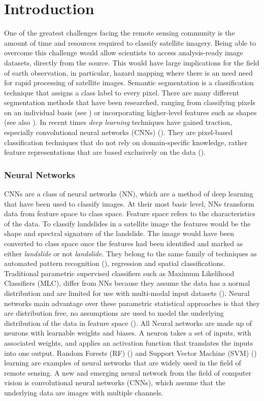 \chapter{Introduction}
One of the greatest challenges facing the remote sensing community is the amount of time and resources required to classify satellite imagery. Being able to overcome this challenge would allow scientists to access analysis-ready image datasets, directly from the source. This would have large implications for the field of earth observation, in particular, hazard mapping where there is an need need for rapid processing of satellite images. Semantic segmentation is a classification technique that assigns a class label to every pixel. There are many different segmentation methods that have been researched, ranging from classifying pixels on an individual basis (see \cite{de01,dwivedi04,enderle05,hussain13, weih10}) or incorporating higher-level features such as shapes (see also \cite{akccay08,holt09,martha11}). In recent times \textit{deep learning} techniques have gained traction, especially convolutional neural networks (CNNs) (\cite{maggiori17a, maggiori17b, mnih13, volpi17}). They are pixel-based classification techniques that do not rely on domain-specific knowledge, rather feature representations that are based exclusively on the data (\cite{maggiori17a,xiao17}).
\subsection*{Neural Networks}
CNNs are a class of neural networks (NN), which are a method of deep learning that have been used to classify images. At their most basic level, NNs transform data from feature space to class space. Feature space refers to the characteristics of the data. To classify landslides in a satellite image the features would be the shape and spectral signature of the landslide. The image would have been converted to class space once the features had been identified and marked as either \textit{landslide} or not \textit{landslide}. They belong to the same family of techniques as automated pattern recognition (\cite{Ritter89}), regression and spatial classifications. Traditional parametric supervised classifiers such as Maximum Likelihood Classifiers (MLC), differ from NNs because they assume the data has a normal distribution and are limited for use with multi-modal input datasets (\cite{Liu11}). Neural networks main advantage over these parametric statistical approaches is that they are distribution free, no assumptions are used to model the underlying distribution of the data in feature space (\cite{Patricia97}). All Neural networks are made up of neurons with learnable weights and biases. A neuron takes a set of inputs, with associated weights, and applies an activation function that translates the inputs into one output. Random Forests (RF) (\cite{belgiu16,Breiman01}) and Support Vector Machine (SVM) (\cite{cortes95,vapnik82}) learning are examples of neural networks that are widely used in the field of remote sensing. A new and emerging neural network from the field of computer vision is convolutional neural networks (CNNs), which assume that the underlying data are images with multiple channels. 

